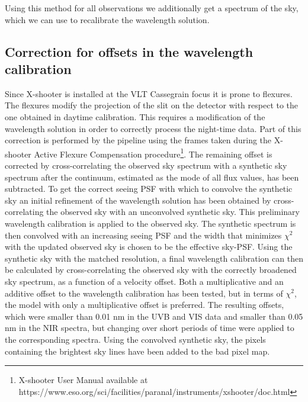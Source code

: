 \documentclass{aa}    %
\begin{document}
Using this method for all observations we additionally get a spectrum of the
sky, which we can use to recalibrate the wavelength solution.


\subsection{Correction for offsets in the wavelength calibration}    \label{wavecal}

Since X-shooter is installed at the VLT Cassegrain focus it is prone to
flexures. The flexures modify the projection of the slit on the detector with
respect to the one obtained in daytime calibration. This requires a modification
of the wavelength solution in order to correctly process the night-time data.
Part of this correction is performed by the pipeline using the frames taken
during the X-shooter Active Flexure Compensation procedure\footnote{X-shooter
	User Manual available at
	https://www.eso.org/sci/facilities/paranal/instruments/xshooter/doc.html}. The
remaining offset is corrected by cross-correlating the observed sky spectrum
with a synthetic sky spectrum \citep{Noll2012, Jones2013} after the continuum,
estimated as the mode of all flux values, has been subtracted. To get the
correct seeing PSF with which to convolve the synthetic sky an initial
refinement of the wavelength solution has been obtained by cross-correlating the
observed sky with an unconvolved synthetic sky. This preliminary wavelength
calibration is applied to the observed sky. The synthetic spectrum is then
convolved with an increasing seeing PSF and the width that minimizes $\chi^2$
with the updated observed sky is chosen to be the effective sky-PSF. Using the
synthetic sky with the matched resolution, a final wavelength calibration can
then be calculated by cross-correlating the observed sky with the correctly
broadened sky spectrum, as a function of a velocity offset. Both a
multiplicative and an additive offset to the wavelength calibration has been
tested, but in terms of $\chi^2$, the model with only a multiplicative offset is
preferred. The resulting offsets, which were smaller than 0.01 nm in the UVB and
VIS data and smaller than 0.05 nm in the NIR spectra, but changing over short
periods of time were applied to the corresponding spectra. Using the convolved
synthetic sky, the pixels containing the brightest sky lines have been added to
the bad pixel map.
\end{document}
